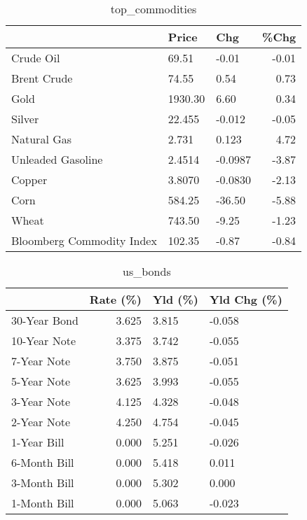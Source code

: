 \documentclass{article}%
\begin{document}
\begin{table}[htbp]%
\caption{top\_commodities}%
\centering%
\begin{adjustbox}{width=1\textwidth}%
\begin{tabular}{lllr}
\toprule
                          &   Price &     Chg &  \%Chg \\
\midrule
               Crude Oil  &   69.51 &   -0.01 & -0.01 \\
             Brent Crude  &   74.55 &    0.54 &  0.73 \\
                    Gold  & 1930.30 &    6.60 &  0.34 \\
                  Silver  &  22.455 &  -0.012 & -0.05 \\
             Natural Gas  &   2.731 &   0.123 &  4.72 \\
       Unleaded Gasoline  &  2.4514 & -0.0987 & -3.87 \\
                  Copper  &  3.8070 & -0.0830 & -2.13 \\
                    Corn  &  584.25 &  -36.50 & -5.88 \\
                   Wheat  &  743.50 &   -9.25 & -1.23 \\
Bloomberg Commodity Index &  102.35 &   -0.87 & -0.84 \\
\bottomrule
\end{tabular}
%
\end{adjustbox}%
\end{table}

%


\begin{table}[htbp]%
\caption{us\_bonds}%
\centering%
\begin{adjustbox}{width=1\textwidth}%
\begin{tabular}{lrll}
\toprule
             &  Rate (\%) & Yld (\%) & Yld Chg (\%) \\
\midrule
30-Year Bond &     3.625 &   3.815 &      -0.058 \\
10-Year Note &     3.375 &   3.742 &      -0.055 \\
 7-Year Note &     3.750 &   3.875 &      -0.051 \\
 5-Year Note &     3.625 &   3.993 &      -0.055 \\
 3-Year Note &     4.125 &   4.328 &      -0.048 \\
 2-Year Note &     4.250 &   4.754 &      -0.045 \\
 1-Year Bill &     0.000 &   5.251 &      -0.026 \\
6-Month Bill &     0.000 &   5.418 &       0.011 \\
3-Month Bill &     0.000 &   5.302 &       0.000 \\
1-Month Bill &     0.000 &   5.063 &      -0.023 \\
\bottomrule
\end{tabular}
%
\end{adjustbox}%
\end{table}
\end{document}
